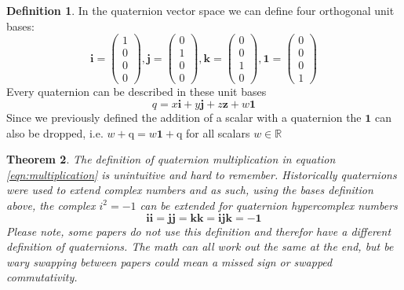 \documentclass{amsart}
\newtheorem{theorem}{Theorem}[section]
\theoremstyle{definition}
\newtheorem{definition}[theorem]{Definition}
\theoremstyle{remark}
\numberwithin{equation}{section}
\begin{document}
\begin{definition}
  In the quaternion vector space we can define four orthogonal unit bases:
  \begin{equation}
    \mathbf{i} =
    \begin{pmatrix}
      1 \\
      0 \\
      0 \\
      0
    \end{pmatrix},
    \mathbf{j} =
    \begin{pmatrix}
      0 \\
      1 \\
      0 \\
      0
    \end{pmatrix}, 
    \mathbf{k} =
    \begin{pmatrix}
      0 \\
      0 \\
      1 \\
      0
    \end{pmatrix}, 
    \mathbf{1} =
    \begin{pmatrix}
      0 \\
      0 \\
      0 \\
      1
    \end{pmatrix}
  \end{equation}
  Every quaternion can be described in these unit bases
  \begin{equation}
    q = x \mathbf{i} + y \mathbf{j} + z \mathbf{z} + w \mathbf{1}
  \end{equation}
  Since we previously defined the addition of a scalar with a quaternion the $\mathbf{1}$ can also be dropped, i.e. $w+\mathrm{q} = w\mathbf{1} +\mathrm{q}$ for all scalars $w\in\mathbb{R}$
\end{definition}

\begin{theorem}
  The definition of quaternion multiplication in equation \ref{eqn:multiplication} is unintuitive and hard to remember. Historically quaternions were used to extend complex numbers and as such, using the bases definition above, the complex $i^2=-1$ can be extended for quaternion hypercomplex numbers
  \begin{equation}
    \mathbf{ii} = \mathbf{jj} = \mathbf{kk} = \mathbf{ijk} = -\mathbf{1}
  \end{equation}
  Please note, some papers do not use this definition and therefor have a different definition of quaternions. The math can all work out the same at the end, but be wary swapping between papers could mean a missed sign or swapped commutativity.
\end{theorem}
\end{document}
